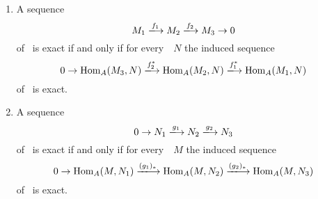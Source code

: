 \begin{proposition}
  \leavevmode
  \begin{enumerate}
    \item
      A sequence
      \[
        M_1
        \xlongto{f_1}
        M_2
        \xlongto{f_2}
        M_3
        \to 0
      \]
      of~{} is exact if and only if for every~{}~$N$ the induced sequence
      \[
        0
        \to
        \Hom_A(M_3, N)
        \xlongto{f_2^*}
        \Hom_A(M_2, N)
        \xlongto{f_1^*}
        \Hom_A(M_1, N)
      \]
      of~{\modules{$\kf$}} is exact.
    \item
      \label{left exactness of covariant hom}
      A sequence
      \[
        0
        \to
        N_1
        \xlongto{g_1}
        N_2
        \xlongto{g_2}
        N_3
      \]
      of~{} is exact if and only if for every~{}~$M$ the induced sequence
      \[
        0
        \to
        \Hom_A(M, N_1)
        \xlongto{(g_1)_*}
        \Hom_A(M, N_2)
        \xlongto{(g_2)_*}
        \Hom_A(M, N_3)
      \]
      of~{\modules{$\kf$}} is exact.
  \end{enumerate}
\end{proposition}


